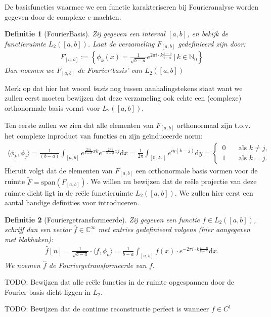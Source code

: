 \documentclass[11pt]{report}
\newcommand{\N}{\mathbb{N}}
\newcommand{\C}{\mathbb{C}}
\theoremstyle{plain}
\newtheorem*{definitie}{Definitie}
\theoremstyle{remark}
\newcommand{\eq}[1]{\begin{eqnarray*} #1 \end{eqnarray*}}
\newcommand{\dx}{\text{d}x}
\newcommand{\dy}{\text{d}y}
\newcommand{\largediv}{\,\big|\,}
\newcommand{\inpr}[2]{\langle #1 , #2 \rangle}
\begin{document}
De basisfuncties waarmee we een functie karakteriseren bij Fourieranalyse worden gegeven door de complexe
$e$-machten.
\begin{definitie}[FourierBasis] Zij gegeven een interval $[a,b]$, en bekijk de functieruimte $L_2([a,b])$. Laat de verzameling $F_{[a,b]}$ gedefinieerd zijn door:
\eq{
  F_{[a,b]} := \left\{ \phi_k(x) = \tfrac{1}{\sqrt{b-a}} e^{2 \pi i \cdot k \frac{x-a}{b-a}} \largediv k \in \N_0 \right\}
}
Dan noemen we $F_{[a,b]}$ de Fourier`basis' van $L_2([a,b])$
\end{definitie}
Merk op dat hier het woord \emph{basis} nog tussen aanhalingstekens staat want we zullen eerst moeten bewijzen dat deze
verzameling ook echte een (complexe) orthonormale basis vormt voor $L_2([a,b])$.

Ten eerste zullen we zien dat alle elementen van $F_{[a,b]}$ orthonormaal zijn t.o.v. het complexe inproduct van functies en zijn ge\"induceerde norm:
\eq{
  \inpr{\phi_k}{\phi_j} = \frac{1}{(b-a)}\int_{[a,b]} e^{\frac{2\pi i}{b-a} x k} 
                                                             e^{-\frac{2\pi i }{b-a} x j} \dx
                        = \frac{1}{2\pi}\int_{[0,2\pi]} e^{iy(k-j)} \dy =
                          \begin{cases}
                            \,0&\quad \text{als } k\neq j, \\
                            \,1&\quad \text{als } k=j.
                          \end{cases}
}
Hieruit volgt dat de elementen van $F_{[a,b]}$ een orthonormale basis vormen voor de ruimte $\tilde F = \text{span}(F_{[a,b]})$.
We willen nu bewijzen dat de re\"ele projectie van deze ruimte dicht ligt in de re\"ele functieruimte $L_2([a,b])$. 
We zullen hier eerst een aantal handige definities voor introduceren.

\begin{definitie}[Fouriergetransformeerde]
Zij gegeven een functie $f\in L_2({[a,b]})$, schrijf dan een vector $\hat f \in \C^\infty$ met entries gedefinieerd volgens (hier aangegeven met blokhaken):
\eq{
  \hat f [n] = \frac{1}{\sqrt{b-a}} \cdot \inpr{f}{\phi_n} = \frac{1}{b-a} \int_{[a,b]} f(x) \cdot e^{-2 \pi i \cdot k \frac{x-a}{b-a}}\dx.
}
We noemen $\hat f$ de Fouriergetransformeerde van $f$.
\end{definitie}

TODO: Bewijzen dat alle re\"ele functies in de ruimte opgespannen door de Fourier-basis dicht liggen in $L_2$.

TODO: Bewijzen dat de continue reconstructie perfect is wanneer $f \in C^1$
\end{document}
